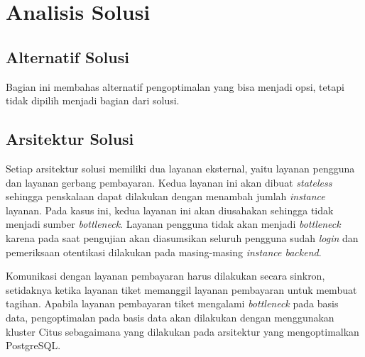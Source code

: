 \chapter{Analisis Solusi}

\section{Alternatif Solusi}

Bagian ini membahas alternatif pengoptimalan yang bisa menjadi opsi, tetapi tidak dipilih menjadi bagian dari solusi.







\section{Arsitektur Solusi}

Setiap arsitektur solusi memiliki dua layanan eksternal, yaitu layanan pengguna dan layanan gerbang pembayaran. Kedua layanan ini akan dibuat \textit{stateless} sehingga penskalaan dapat dilakukan dengan menambah jumlah \textit{instance} layanan. Pada kasus ini, kedua layanan ini akan diusahakan sehingga tidak menjadi sumber \textit{bottleneck}. Layanan pengguna tidak akan menjadi \textit{bottleneck} karena pada saat pengujian akan diasumsikan seluruh pengguna sudah \textit{login} dan pemeriksaan otentikasi dilakukan pada masing-masing \textit{instance backend}.

Komunikasi dengan layanan pembayaran harus dilakukan secara sinkron, setidaknya ketika layanan tiket memanggil layanan pembayaran untuk membuat tagihan. Apabila layanan pembayaran tiket mengalami \textit{bottleneck} pada basis data, pengoptimalan pada basis data akan dilakukan dengan menggunakan kluster Citus sebagaimana yang dilakukan pada arsitektur yang mengoptimalkan PostgreSQL.






